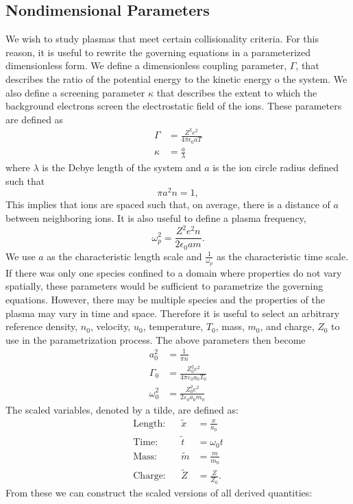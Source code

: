 \documentclass{article}
\begin{document}
\subsection{Nondimensional Parameters}
We wish to study plasmas that meet certain collisionality criteria. For this reason, it is useful to rewrite the governing equations in a parameterized dimensionless form. We define a dimensionless coupling parameter, $\Gamma$, that describes the ratio of the potential energy to the kinetic energy o the system. We also define a screening parameter $\kappa$ that describes the extent to which the background electrons screen the electrostatic field of the ions. These parameters are defined as
\begin{align}
\Gamma&=\frac{Z^2e^2}{4\pi\epsilon_0aT}\\
\kappa&=\frac{a}{\lambda}
\end{align} where $\lambda$ is the Debye length of the system and $a$ is the ion circle radius defined such that 
\begin{equation}\pi a^2n=1,
\end{equation}This implies that ions are spaced such that, on average, there is a distance of $a$ between neighboring ions. It is also useful to define a plasma frequency,
\begin{equation}
\omega_p^2=\frac{Z^2e^2n}{2\epsilon_0 a m}.
\end{equation}We use $a$ as the characteristic length scale and $\frac{1}{\omega_p}$ as the characteristic time scale. If there was only one species confined to a domain where properties do not vary spatially, these parameters would be sufficient to parametrize the governing equations. However, there may be multiple species and the properties of the plasma may vary in time and space. Therefore it is useful to select an arbitrary reference density, $n_0$, velocity, $u_0$, temperature, $T_0$, mass, $m_0$, and charge, $Z_0$ to use in the parametrization process. The above parameters then become
\begin{align}
a_0^2 		&= \frac{1}{\pi n} \\
\Gamma_0 	&= \frac{Z_0^2e^2}{4\pi\varepsilon_0a_0T_0} \\
\omega_0^2	&= \frac{Z_0^2e^2}{2\varepsilon_0a_0m_0}
\end{align}The scaled variables, denoted by a tilde, are defined as:
\begin{align*}
\text{Length:}&			&\tilde{x} &= \frac{x}{a_0} 	\\
\text{Time:}&			&\tilde{t} &= \omega_0 t 	\\
\text{Mass:}&			&\tilde{m} &= \frac{m}{m_0} 	\\
\text{Charge:}&			&\tilde{Z} &= \frac{Z}{Z_0}.	
\end{align*}From these we can construct the scaled versions of all derived quantities:
\end{document}
